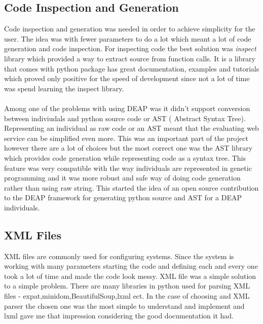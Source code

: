 \subsection{Code Inspection and Generation}
Code inspection and generation was needed in order to achieve simplicity for the user. The idea was with fewer parameters to do a lot which meant a lot of code generation
and code inspection. For inspecting code the best solution was \textit{inspect} library which provided a way to extract source from function calls. It is a library that comes with python package
has great documentation, examples and tutorials which proved only positive for the speed of development since not a lot of time was spend learning the inspect library.
\paragraph{}
Among one of the problems with using DEAP was it didn't support conversion between indiviudals and python source code or AST ( Abstract Syntax Tree). Representing an individual as raw code or an AST meant that 
the evaluating web service can be simplified even more. This was an important part of the project however there are a lot of choices but the most correct one was the AST library which
provides code generation while representing code as a syntax tree. This feature was very compatible with the way individuals are represented in genetic programming and it was more
robust and safe way of doing code generation rather than using raw string.  This started the idea of an open source contribution to the DEAP framework for generating python source 
and AST for a DEAP individuals.
\paragraph{}
\subsection{XML Files}
XML files are commonly used for configuring systems. Since the system is working with many parameters starting the code and defining each and every one took a lot of time and made the code look messy.
XML file was a simple solution to a simple problem. There are many libraries in python used for parsing XML files - expat,minidom,BeautifulSoup,lxml ect. In the case of choosing and XML parser the chosen
one was the most simple to understand and implement and lxml gave me that impression considering the good documentation it had.
\paragraph{}
